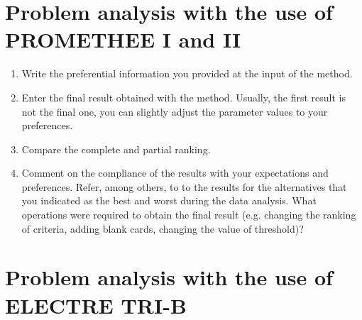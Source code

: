\documentclass{article}
\begin{document}

\section{Problem analysis with the use of PROMETHEE I and II}

\begin{enumerate}

    \item Write the preferential information you provided at the input of the method.

    \item Enter the final result obtained with the method. Usually, the first result is not the final one, you can
    slightly adjust the parameter values to your preferences.

    \item Compare the complete and partial ranking.

    \item Comment on the compliance of the results with your expectations and preferences. Refer, among
    others, to to the results for the alternatives that you indicated as the best and worst during the data
    analysis. What operations were required to obtain the final result (e.g. changing the ranking of criteria,
    adding blank cards, changing the value of threshold)?

\end{enumerate}


\section{Problem analysis with the use of ELECTRE TRI-B}
\end{document}
